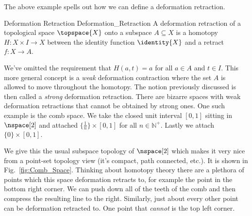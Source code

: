 \documentclass{book}                                                           %
\begin{document}
                The above example spells out how we can define a deformation
                retraction.
                \begin{fdefinition}{Deformation Retraction}
                                   {Deformation_Retraction}
                    A deformation retraction of a topological space
                    $\topspace{X}$ onto a subspace $A\subseteq{X}$ is a
                    homotopy $H:X\times{I}\rightarrow{X}$ between the identity
                    function $\identity{X}$ and a retract $f:X\rightarrow{A}$.
                \end{fdefinition}
                We've omitted the requirement that $H(a,t)=a$ for all $a\in{A}$
                and $t\in{I}$. This more general concept is a \textit{weak}
                deformation contraction where the set $A$ is
                allowed to move throughout the homotopy. The notion previously
                discussed is then called a \textit{strong} deformation
                retraction. There are bizarre spaces with weak deformation
                retractions that cannot be obtained by strong ones. One such
                example is the comb space. We take the closed unit
                interval $[0,1]$ sitting in $\nspace[2]$ and attached
                $\{\frac{1}{n}\}\times[0,1]$ for all $n\in\mathbb{N}^{+}$.
                Lastly we attach $\{0\}\times[0,1]$.
                \par\hfill\par
                \begin{minipage}{0.50\textwidth}
                    We give this the usual subspace topology of $\nspace[2]$
                    which makes it very nice from a point-set topology view
                    (it's compact, path connected, etc.). It is shown in
                    Fig.~\ref{fig:Comb_Space}. Thinking about homotopy theory
                    there are a plethora of points which this space deformation
                    retracts to, for example the point in the bottom right
                    corner. We can push down all of the teeth of the comb and
                    then compress the resulting line to the right. Similarly,
                    just about every other point can be deformation retracted
                    to. One point that \textit{cannot} is the top left corner.
                \end{minipage}
                \hfill
\end{document}
